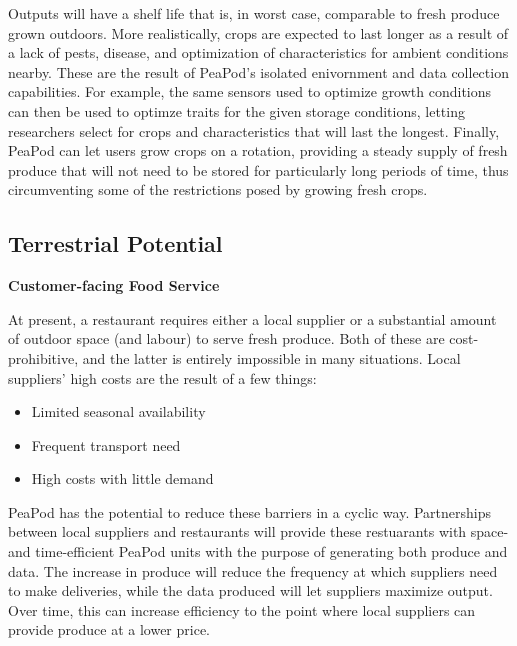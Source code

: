 \documentclass{report}
\begin{document}
Outputs will have a shelf life that is, in worst case, comparable to fresh produce grown outdoors. More realistically, crops are expected to last longer as a result of a lack of pests, disease, and optimization of characteristics for ambient conditions nearby. These are the result of PeaPod's isolated enivornment and data collection capabilities. For example, the same sensors used to optimize growth conditions can then be used to optimze traits for the given storage conditions, letting researchers select for crops and characteristics that will last the longest. Finally, PeaPod can let users grow crops on a rotation, providing a steady supply of fresh produce that will not need to be stored for particularly long periods of time, thus circumventing some of the restrictions posed by growing fresh crops.


\subsection{Terrestrial Potential}
\label{sec:terrestrial}




\textbf{Customer-facing Food Service} %

At present, a restaurant requires either a local supplier or a substantial amount of outdoor space (and labour) to serve fresh produce. Both of these are cost-prohibitive, and the latter is entirely impossible in many situations. Local suppliers' high costs are the result of a few things:
\begin{itemize}
    \item Limited seasonal availability
    \item Frequent transport need
    \item High costs with little demand
\end{itemize}
PeaPod has the potential to reduce these barriers in a cyclic way. Partnerships between local suppliers and restaurants will provide these restuarants with space- and time-efficient PeaPod units with the purpose of generating both produce and data. The increase in produce will reduce the frequency at which suppliers need to make deliveries, while the data produced will let suppliers maximize output. Over time, this can increase efficiency to the point where local suppliers can provide produce at a lower price.
\end{document}
